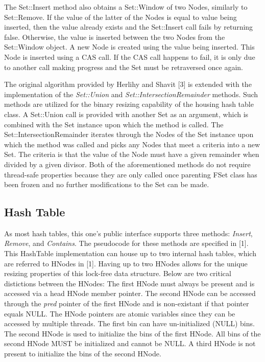 \documentclass[11pt]{article} %
\begin{document}
The Set::Insert method also obtains a Set::Window of two Nodes, similarly to Set::Remove. If the value of the latter of the Nodes is equal to value being inserted, then the value already exists and the Set::Insert call fails by returning false. Otherwise, the value is inserted between the two Nodes from the Set::Window object. A new Node is created using the value being inserted. This Node is inserted using a CAS call. If the CAS call happens to fail, it is only due to another call making progress and the Set must be retraversed once again.

The original algorithm provided by Herlihy and Shavit [3] is extended with the implementation of the \textit{Set::Union} and \textit{Set::IntersectionRemainder} methods. Such methods are utilized for the binary resizing capability of the housing hash table class. A Set::Union call is provided with another Set as an argument, which is combined with the Set instance upon which the method is called. The Set::IntersectionRemainder iterates through the Nodes of the Set instance upon which the method was called and picks any Nodes that meet a criteria into a new Set. The criteria is that the value of the Node must have a given remainder when divided by a given divisor. Both of the aforementioned methods do not require thread-safe properties because they are only called once parenting FSet class has been frozen and no further modifications to the Set can be made.

\subsection{Hash Table}

As most hash tables, this one's public interface supports three methods: \textit{Insert}, \textit{Remove}, and \textit{Contains}. The pseudocode for these methods are specified in [1]. This HashTable implementation can house up to two internal hash tables, which are referred to HNodes in [1]. Having up to two HNodes allows for the unique resizing properties of this lock-free data structure. Below are two critical distictions between the HNodes:
The first HNode must always be present and is accessed via a head HNode member pointer. The second HNode can be accessed through the \textit{pred} pointer of the first HNode and is non-existant if that pointer equals NULL. The HNode pointers are atomic variables since they can be accessed by multiple threads.
The first bin can have un-initialized (NULL) bins. The second HNode is used to initialize the bins of the first HNode. All bins of the second HNode MUST be initialized and cannot be NULL. A third HNode is not present to initialize the bins of the second HNode.
\end{document}
